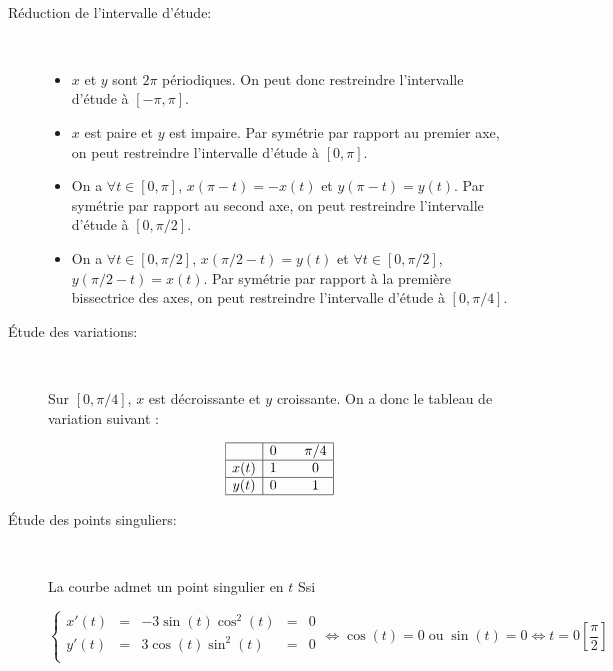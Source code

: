 \documentclass[12pt]{article}
\begin{document}
\begin{demo}~

  \begin{description}
  \item[R\'eduction de l'intervalle d'\'etude:]~

    \begin{itemize}
    \item     $x$ et $y$ sont $2\pi$ p\'eriodiques. On peut donc
      restreindre l'intervalle d'\'etude \`a $[-\pi,\pi]$.
    \item $x$ est paire et $y$ est impaire. Par sym\'etrie par rapport au
      premier axe, on peut restreindre l'intervalle d'\'etude \`a $[0,\pi]$.
    \item On a $\forall t\in [0,\pi]$, $x(\pi-t)=-x(t)$ et
      $y(\pi-t)=y(t)$. Par sym\'etrie par rapport au second axe, on peut
      restreindre l'intervalle d'\'etude \`a $[0,\pi/2]$.
    \item  On a $\forall t\in [0,\pi/2]$, $x(\pi/2-t)=y(t)$ et $\forall
      t\in [0,\pi/2]$, $y(\pi/2-t)=x(t)$. Par sym\'etrie par rapport \`a la
      premi\`ere bissectrice des axes, on peut
      restreindre l'intervalle d'\'etude \`a $[0,\pi/4]$.

    \end{itemize}

  \item[\'Etude des variations:]~

    Sur $[0, \pi/4]$, $x$ est d\'ecroissante et $y$ croissante. On a donc
    le tableau de variation suivant :
    
$$
    \begin{array}{|c|ccc|}
      \hline 
      & 0 & & \pi/4\\
      \hline 
      x(t) & 1 & & 0\\
      \hline 
      y(t) & 0 & & 1\\
\hline
    \end{array}
 $$
  
\item[\'Etude des points singuliers:]~
 
La courbe admet un point singulier en $t$ Ssi 

$$
\left\{ \begin{array}{lcccr}
x'(t)&=&-3\sin(t) \cos^2(t)&=&0\\
y'(t)&=&3\cos(t)\sin^2(t)&=&0\\
\end{array}\right. 
\Leftrightarrow \cos(t)=0\; \text{ou}\; \sin(t)=0
\Leftrightarrow t=0\left[\frac{\pi}{2}\right]
$$


\end{description}
\end{demo}
\end{document}
